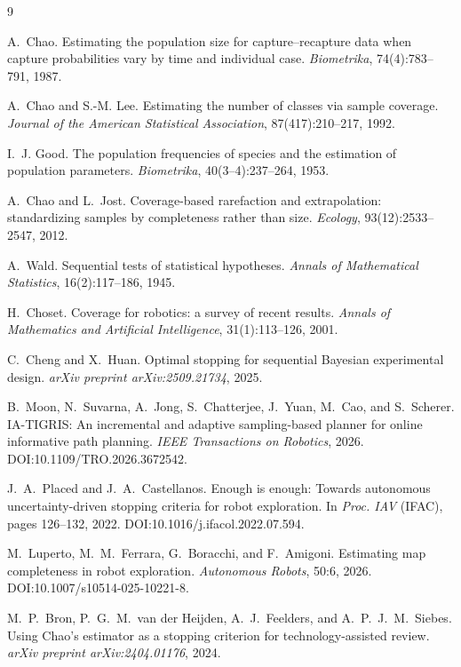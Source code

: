 \documentclass[11pt]{article}
\begin{document}
\begin{thebibliography}{9}

A.~Chao.
\newblock Estimating the population size for capture--recapture data when capture probabilities vary
by time and individual case.
\newblock \emph{Biometrika}, 74(4):783--791, 1987.

A.~Chao and S.-M. Lee.
\newblock Estimating the number of classes via sample coverage.
\newblock \emph{Journal of the American Statistical Association}, 87(417):210--217, 1992.

I.~J. Good.
\newblock The population frequencies of species and the estimation of population parameters.
\newblock \emph{Biometrika}, 40(3--4):237--264, 1953.

A.~Chao and L.~Jost.
\newblock Coverage-based rarefaction and extrapolation: standardizing samples by completeness rather
than size.
\newblock \emph{Ecology}, 93(12):2533--2547, 2012.

A.~Wald.
\newblock Sequential tests of statistical hypotheses.
\newblock \emph{Annals of Mathematical Statistics}, 16(2):117--186, 1945.

H.~Choset.
\newblock Coverage for robotics: a survey of recent results.
\newblock \emph{Annals of Mathematics and Artificial Intelligence}, 31(1):113--126, 2001.

C.~Cheng and X.~Huan.
\newblock Optimal stopping for sequential Bayesian experimental design.
\newblock \emph{arXiv preprint arXiv:2509.21734}, 2025.

B.~Moon, N.~Suvarna, A.~Jong, S.~Chatterjee, J.~Yuan, M.~Cao, and S.~Scherer.
\newblock IA-TIGRIS: An incremental and adaptive sampling-based planner for online informative path
planning.
\newblock \emph{IEEE Transactions on Robotics}, 2026. DOI:10.1109/TRO.2026.3672542.

J.~A.~Placed and J.~A.~Castellanos.
\newblock Enough is enough: Towards autonomous uncertainty-driven stopping criteria for robot
exploration.
\newblock In \emph{Proc. IAV} (IFAC), pages 126--132, 2022. DOI:10.1016/j.ifacol.2022.07.594.

M.~Luperto, M.~M.~Ferrara, G.~Boracchi, and F.~Amigoni.
\newblock Estimating map completeness in robot exploration.
\newblock \emph{Autonomous Robots}, 50:6, 2026. DOI:10.1007/s10514-025-10221-8.

M.~P.~Bron, P.~G.~M.~van der Heijden, A.~J.~Feelders, and A.~P.~J.~M.~Siebes.
\newblock Using Chao's estimator as a stopping criterion for technology-assisted review.
\newblock \emph{arXiv preprint arXiv:2404.01176}, 2024.

\end{thebibliography}
\end{document}

